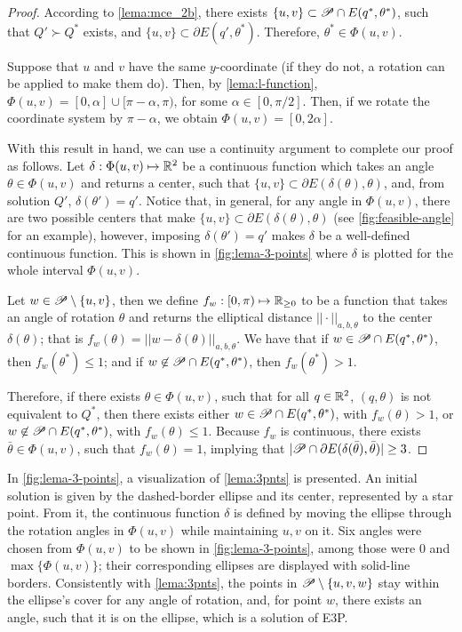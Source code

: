 \begin{proof}
	According to \autoref{lema:mce_2b}, there exists $\{u, v\} \subset \mathscr{P} \cap E(q^*, \theta^*)$, such that $Q' \succ Q^*$ exists, and $\{u, v\} \subset \partial E(q', \theta^*)$. Therefore, $\theta^*\in\Phi(u,v)$.
	
	Suppose that $u$ and $v$ have the same $y$-coordinate (if they do not, a rotation can be applied to make them do). Then, by \autoref{lema:l-function}, $\Phi(u,v)=[0, \alpha] \cup [\pi-\alpha, \pi)$, for some $\alpha \in [0, \pi/2]$. Then, if we rotate the coordinate system by $\pi-\alpha$, we obtain $\Phi(u,v)=[0, 2\alpha]$.
	
	With this result in hand, we can use a continuity argument to complete our proof as follows.
	Let $\delta : \Phi(u,v) \mapsto \mathbb{R}^2$ be a continuous function which takes an angle $\theta\in\Phi(u,v)$ and returns a center, such that $\{u,v\} \subset \partial E(\delta(\theta), \theta)$, and, from solution $Q'$, $\delta(\theta') = q'$. Notice that, in general, for any angle in $\Phi(u,v)$, there are two possible centers that make $\{u,v\} \subset \partial E(\delta(\theta), \theta)$ (see \autoref{fig:feasible-angle} for an example), however, imposing $\delta(\theta') = q'$ makes $\delta$ be a well-defined continuous function. This is shown in \autoref{fig:lema-3-points} where $\delta$ is plotted for the whole interval $\Phi(u,v)$.
	
	Let $w\in \mathscr{P} \setminus \{u,v\}$, then we define $f_w  : [0, \pi) \mapsto \mathbb{R}_{\ge0}$ to be a function that takes an angle of rotation $\theta$ and returns the elliptical distance $||\cdot||_{a,b,\theta}$ to the center $\delta(\theta)$; that is $f_w(\theta)=||w-\delta(\theta)||_{a,b,\theta}$.
	We have that if $w \in \mathscr{P} \cap E(q^*, \theta^*)$, then $f_w(\theta^*) \le 1$; and if $w \not\in \mathscr{P} \cap E(q^*, \theta^*)$, then $f_w(\theta^*) > 1$.
	
	Therefore, if there exists $\theta\in\Phi(u,v)$, such that for all $q\in\mathbb{R}^2$, $(q, \theta)$ is not equivalent to $Q^*$, then there exists either $w \in \mathscr{P} \cap E(q^*, \theta^*)$, with $f_w(\theta)>1$, or $w \not\in \mathscr{P} \cap E(q^*, \theta^*)$, with $f_w(\theta)\le 1$. Because $f_w$ is continuous, there exists $\bar{\theta}\in\Phi(u,v)$, such that $f_w(\theta)=1$, implying that $|\mathscr{P} \cap \partial E(\delta(\bar{\theta}), \bar{\theta})| \ge 3$.
\end{proof}

In \autoref{fig:lema-3-points}, a visualization of \autoref{lema:3pnts} is presented.
An initial solution is given by the dashed-border ellipse and its center, represented by a star point. From it, the continuous function $\delta$ is defined by moving the ellipse through the rotation angles in $\Phi(u,v)$ while maintaining $u, v$ on it. Six angles were chosen from $\Phi(u,v)$ to be shown in \autoref{fig:lema-3-points}, among those were $0$ and $\max\{\Phi(u,v)\}$; their corresponding ellipses are displayed with solid-line borders.
Consistently with \autoref{lema:3pnts}, the points in $\mathscr{P} \setminus \{u, v, w\}$ stay within the ellipse's cover for any angle of rotation, and, for point $w$, there exists an angle, such that it is on the ellipse, which is a solution of E3P.


